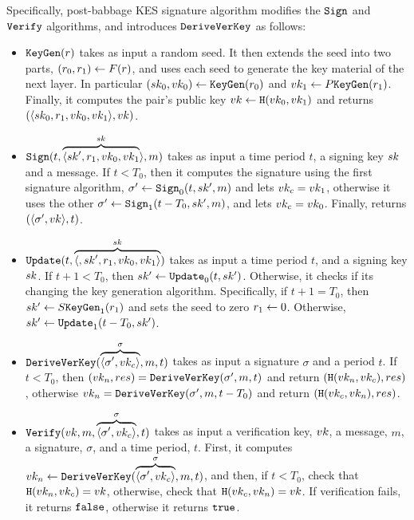 Specifically, post-babbage KES signature algorithm modifies the $\texttt{Sign}$ and $\texttt{Verify}$ algorithms, and introduces
$\texttt{DeriveVerKey}$ as follows:
\begin{itemize}
    \item $\texttt{KeyGen}(r)$ takes as input a random seed. It then extends the seed into two parts,
    $(r_0, r_1)\gets F(r)$, and uses each seed to generate the key material of the next layer. In
    particular $(sk_0, vk_0)\gets\texttt{KeyGen}(r_0)$ and $vk_1\gets P\texttt{KeyGen}(r_1)$. Finally, it computes
    the pair's public key $vk\gets\texttt{H}(vk_0, vk_1)$ and returns $(\langle sk_0, r_1, vk_0,
    vk_1\rangle, vk)$.
    \item $\texttt{Sign}(t, \overbrace{\langle sk', r_1, vk_0, vk_1}^{sk}\rangle, m)$
    takes as input a time period $t$, a signing key $sk$ and a message. If $t<T_0$, then it computes the
    signature using the first signature algorithm, $\sigma'\gets\texttt{Sign}_0(t, sk', m)$ and lets $vk_c = vk_1$,
    otherwise it uses the other $\sigma'\gets\texttt{Sign}_1(t - T_0, sk', m)$, and lets $vk_c = vk_0$. Finally,
    returns $(\langle\sigma', vk\rangle,t)$.
    \item $\texttt{Update}(t, \overbrace{\langle, sk', r_1, vk_0, vk_1\rangle}^{sk})$ takes as input
    a time period $t$, and a signing key $sk$. If $t+1<T_0$, then $sk'\gets\texttt{Update}_0(t,
    sk')$. Otherwise, it checks if its changing the key
    generation algorithm. Specifically, if $t+1=T_0$, then $sk'\gets S\texttt{KeyGen}_1(r_1)$ and sets the seed
    to zero $r_1\gets 0$. Otherwise, $sk'\gets\texttt{Update}_1(t-T_0, sk')$.
    \item $\texttt{DeriveVerKey}(\overbrace{\langle\sigma', vk_c\rangle}^{\sigma}, m, t)$ takes as input a signature $\sigma$ and a
    period $t$. If $t<T_0$, then $(vk_n, res) = \texttt{DeriveVerKey}(\sigma', m, t)$ and return $(\texttt{H}(vk_n, vk_c), res)$,
    otherwise $vk_n = \texttt{DeriveVerKey}(\sigma', m, t - T_0)$ and return $(\texttt{H}(vk_c, vk_n), res)$.
    \item $\texttt{Verify}(vk, m, \overbrace{\langle\sigma', vk_c\rangle}^{\sigma},  t)$ takes as input
    a verification key, $vk$, a message, $m$, a signature, $\sigma$, and a time period, $t$. First, it
    computes $vk_n\gets\texttt{DeriveVerKey}(\overbrace{\langle\sigma', vk_c\rangle}^{\sigma}, m, t)$, and then, if
    $t<T_0$, check that $\texttt{H}(vk_n, vk_c) = vk$, otherwise, check that $\texttt{H}(vk_c, vk_n) = vk$. If verification
    fails, it returns $\texttt{false}$, otherwise it returns $\texttt{true}$.
\end{itemize}

